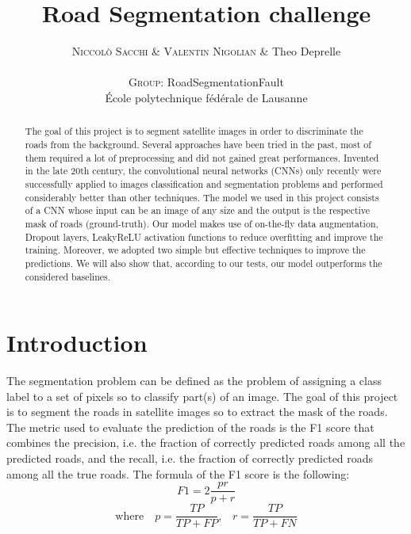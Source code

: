 \documentclass[10pt,conference,compsocconf]{IEEEtran}
\begin{document}
\pretitle{\begin{center}\Huge\bfseries} %
\posttitle{\end{center}} %
\title{Road Segmentation challenge}

\author{
	\textsc{Niccol\`{o} Sacchi \& Valentin Nigolian} \& Theo Deprelle \\
	\normalsize{} \\
	\textsc{Group:}
	\normalsize{RoadSegmentationFault}\\
	\normalsize \'{E}cole polytechnique f\'{e}d\'{e}rale de Lausanne
}

\maketitle

\begin{abstract}
  The goal of this project is to segment satellite images in order to discriminate the roads from the background. Several approaches have been tried in the past, most of them required a lot of preprocessing and did not gained great performances. Invented in the late 20th century, the convolutional neural networks (CNNs) only recently were successfully applied to images classification and segmentation problems and performed considerably better than other techniques.
  The model we used in this project consists of a CNN whose input can be an image of any size and the output is the respective mask of roads (ground-truth). Our model makes use of on-the-fly data augmentation, Dropout layers, LeakyReLU activation functions to reduce overfitting and improve the training. Moreover, we adopted two simple but effective techniques to improve the predictions. We will also show that, according to our tests, our model outperforms the considered baselines.
\end{abstract}

\section{Introduction}
The segmentation problem can be defined as the problem of assigning a class label to a set of pixels so to classify part(s) of an image.
The goal of this project is to segment the roads in satellite images so to extract the mask of the roads. The metric used to evaluate the prediction of the roads is the F1 score that combines the precision, i.e. the fraction of correctly predicted roads among all the predicted roads, and the recall, i.e. the fraction of correctly predicted roads among all the true roads. The formula of the F1 score is the following:
$$F1=2\frac{pr}{p+r}$$ $$\textrm{where} \quad p=\frac{TP}{TP+FP} \textrm{,} \quad r=\frac{TP}{TP+FN}$$
\end{document}
